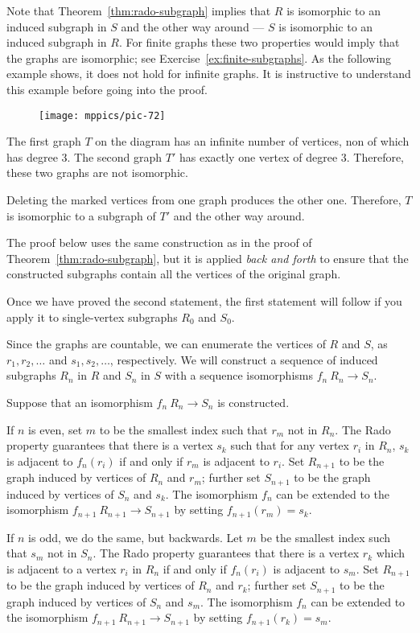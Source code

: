 Note that Theorem~\ref{thm:rado-subgraph} implies that $R$ is isomorphic to an induced subgraph in $S$ and the other way around --- $S$ is isomorphic to an induced subgraph in $R$.
For finite graphs these two properties would imply that the graphs are isomorphic; see Exercise~\ref{ex:finite-subgraphs}.
As the following example shows, it does not hold for infinite graphs.
It is instructive to understand this example before going into the proof.

\begin{figure}[ht!]%
\vskip-0mm
\centering
\texttt{[image: mppics/pic-72]}
\vskip-0mm
\end{figure}
 
The first graph $T$ on the diagram has an infinite number of vertices, non of which has degree 3.
The second graph $T'$ has exactly one vertex of degree 3. 
Therefore, these two graphs are not isomorphic.

Deleting the marked vertices from one graph produces the other one. 
Therefore, $T$ is isomorphic to a subgraph of $T'$ and the other way around.

The proof below uses the same construction as in the proof of Theorem~\ref{thm:rado-subgraph}, but it is applied \textit{back and forth} to ensure that the constructed subgraphs contain all the vertices of the original graph.


Once we have proved the second statement,
the first statement will follow if you apply it to single-vertex subgraphs $R_0$ and $S_0$.

Since the graphs are countable,
we can enumerate the vertices of $R$ and $S$, as $r_1 , r_2 , \dots$ and $s_1, s_2,\dots$, respectively. 
We will construct a sequence of induced subgraphs $R_n$ in $R$ and $S_n$ in $S$ with a sequence isomorphisms $f_n\:R_n\to S_n$.

Suppose that an isomorphism $f_n\:R_n\to S_n$ is constructed. 

If $n$ is even, set $m$ to be the smallest index such that $r_m$ not in $R_n$.
The Rado property guarantees that there is a vertex $s_k$ such that for any vertex $r_i$ in $R_n$, $s_k$ is adjacent to $f_n(r_i)$ if and only if $r_m$ is adjacent to $r_i$.
Set $R_{n+1}$ to be the graph induced by vertices of $R_n$ and $r_m$;
further set $S_{n+1}$ to be the graph induced by vertices of $S_n$ and $s_k$.
The isomorphism $f_n$ can be extended to the isomorphism $f_{n+1}\:R_{n+1}\to S_{n+1}$ by
setting $f_{n+1}(r_m)=s_k$.  

If $n$ is odd, we do the same, but backwards.
Let $m$ be the smallest index such that $s_m$ not in $S_n$.
The Rado property guarantees that there is a vertex $r_k$ which is adjacent to a vertex $r_i$ in $R_n$ if and only if $f_n(r_i)$ is adjacent to $s_m$.
Set $R_{n+1}$ to be the graph induced by vertices of $R_n$ and $r_k$;
further set $S_{n+1}$ to be the graph induced by vertices of $S_n$ and $s_m$.
The isomorphism $f_n$ can be extended to the isomorphism $f_{n+1}\:R_{n+1}\to S_{n+1}$ by
setting $f_{n+1}(r_k)=s_m$.

